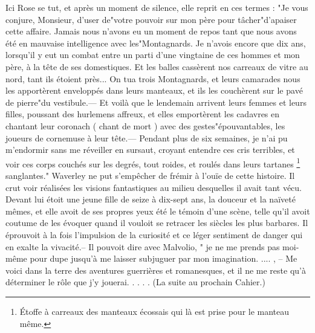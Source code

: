 Ici Rose se tut, et après un moment de silence, elle reprit en ces termes :
"Je vous conjure, Monsieur, d'user de"votre pouvoir sur mon père pour tâcher"d'apaiser cette affaire. Jamais nous n'avons eu un moment de repos tant que nous avons été en mauvaise intelligence avec les"Montagnards. Je n'avois encore que dix ans, lorsqu'il y eut un combat entre un parti d'une vingtaine de ces hommes et mon père, à la tête de ses domestiques. Et les balles cassèrent nos carreaux de vitre au nord, tant ils étoient près... On tua trois Montagnards, et leurs camarades nous les apportèrent enveloppés dans leurs manteaux, et ils les couchèrent sur le pavé de pierre"du vestibule.— Et voilà que le lendemain arrivent leurs femmes et leurs filles, poussant des hurlemens affreux, et elles emportèrent les cadavres en chantant leur coronach ( chant de mort ) avec des gestes"épouvantables, les joueurs de cornemuse à leur tête.— Pendant plus de six semaines, je n'ai pu m'endormir sans me réveiller en sursaut, croyant entendre ces cris terribles,\setcounter{page}{560} et voir ces corps couchés sur les degrés, tout roides, et roulés dans leurs tartanes \footnote{Étoffe à carreaux des manteaux écossais qui là est prise pour le manteau même.} sanglantes." Waverley ne put s'empêcher de frémir à l'ouïe de cette histoire. Il crut voir réalisées les visions fantastiques au milieu desquelles il avait tant vécu. Devant lui étoit une jeune fille de seize à dix-sept ans, la douceur et la naïveté mêmes, et elle avoit de ses propres yeux été le témoin d'une scène, telle qu'il avoit coutume de les évoquer quand il vouloit se retracer les siècles les plus barbares. Il éprouvoit à la fois l'impulsion de la curiosité et ce léger sentiment de danger qui en exalte la vivacité.– Il pouvoit dire avec Malvolio, " je ne me prends pas moi-même pour dupe jusqu'à me laisser subjuguer par mon imagination. .... , – Me voici dans la terre des aventures guerrières et romanesques, et il ne me reste qu'à déterminer le rôle que j'y jouerai. . . . . (La suite au prochain Cahier.)